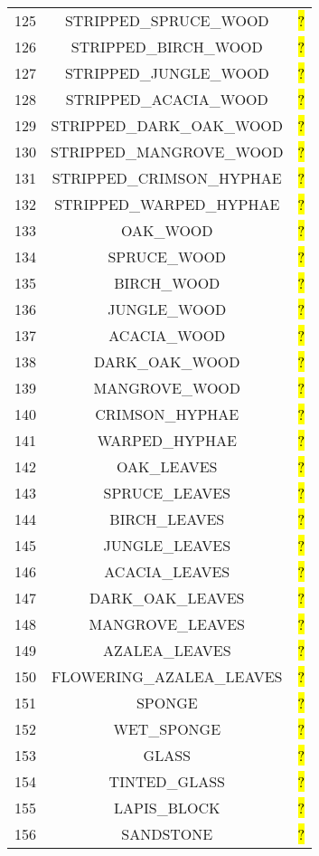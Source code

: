 \documentclass[11pt]{article}
\newcommand\myworries[1]{\sethlcolor{red}\hl{#1}}
\begin{document}
\begin{longtable}{ |c|c|c| }
125 & STRIPPED\_SPRUCE\_WOOD & \myworries{?} \\
126 & STRIPPED\_BIRCH\_WOOD & \myworries{?} \\
127 & STRIPPED\_JUNGLE\_WOOD & \myworries{?} \\
128 & STRIPPED\_ACACIA\_WOOD & \myworries{?} \\
129 & STRIPPED\_DARK\_OAK\_WOOD & \myworries{?} \\
130 & STRIPPED\_MANGROVE\_WOOD & \myworries{?} \\
131 & STRIPPED\_CRIMSON\_HYPHAE & \myworries{?} \\
132 & STRIPPED\_WARPED\_HYPHAE & \myworries{?} \\
133 & OAK\_WOOD & \myworries{?} \\
134 & SPRUCE\_WOOD & \myworries{?} \\
135 & BIRCH\_WOOD & \myworries{?} \\
136 & JUNGLE\_WOOD & \myworries{?} \\
137 & ACACIA\_WOOD & \myworries{?} \\
138 & DARK\_OAK\_WOOD & \myworries{?} \\
139 & MANGROVE\_WOOD & \myworries{?} \\
140 & CRIMSON\_HYPHAE & \myworries{?} \\
141 & WARPED\_HYPHAE & \myworries{?} \\
142 & OAK\_LEAVES & \myworries{?} \\
143 & SPRUCE\_LEAVES & \myworries{?} \\
144 & BIRCH\_LEAVES & \myworries{?} \\
145 & JUNGLE\_LEAVES & \myworries{?} \\
146 & ACACIA\_LEAVES & \myworries{?} \\
147 & DARK\_OAK\_LEAVES & \myworries{?} \\
148 & MANGROVE\_LEAVES & \myworries{?} \\
149 & AZALEA\_LEAVES & \myworries{?} \\
150 & FLOWERING\_AZALEA\_LEAVES & \myworries{?} \\
151 & SPONGE & \myworries{?} \\
152 & WET\_SPONGE & \myworries{?} \\
153 & GLASS & \myworries{?} \\
154 & TINTED\_GLASS & \myworries{?} \\
155 & LAPIS\_BLOCK & \myworries{?} \\
156 & SANDSTONE & \myworries{?} \\

\end{longtable}
\end{document}
